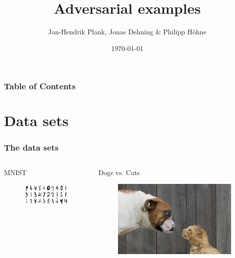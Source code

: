 \documentclass[handout]{beamer}
\begin{document}
\title{Adversarial examples}
\author{Jan-Hendrik Plank, Jonas Dehning \& Philipp Höhne}
\date{\today} 


\begin{frame}
\titlepage
\end{frame} 

\begin{frame}
\frametitle{Table of Contents}
\tableofcontents
\end{frame} 

\section{Data sets}

\begin{frame}
\frametitle{The data sets} 
\begin{columns}[T]
\begin{column}{0.5\textwidth}
\centering
MNIST
\begin{figure}
\includegraphics[width=0.7\linewidth]{./pictures/MNIST.png}
\end{figure}
\end{column}
\begin{column}{0.5\textwidth}
\centering
Dogs vs. Cats
\begin{figure}
\includegraphics[width=0.7\linewidth]{./pictures/dogs_vs_cats.jpg}
\end{figure}
\end{column}
\end{columns}

\end{frame} 
\end{document}
